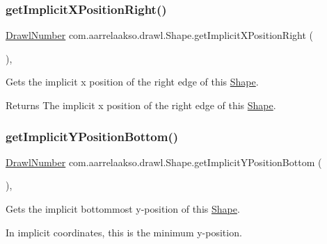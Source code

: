 \subsubsection{\texorpdfstring{get\+Implicit\+X\+Position\+Right()}{getImplicitXPositionRight()}}
{\footnotesize\ttfamily \hyperlink{classcom_1_1aarrelaakso_1_1drawl_1_1_drawl_number}{Drawl\+Number} com.\+aarrelaakso.\+drawl.\+Shape.\+get\+Implicit\+X\+Position\+Right (\begin{DoxyParamCaption}{ }\end{DoxyParamCaption})\hspace{0.3cm}{\ttfamily [protected]}, {\ttfamily [inherited]}}



Gets the implicit x position of the right edge of this \hyperlink{classcom_1_1aarrelaakso_1_1drawl_1_1_shape}{Shape}. 

\begin{DoxyReturn}{Returns}
The implicit x position of the right edge of this \hyperlink{classcom_1_1aarrelaakso_1_1drawl_1_1_shape}{Shape}. 
\end{DoxyReturn}
\mbox{\label{classcom_1_1aarrelaakso_1_1drawl_1_1_shape_af04961079cb3993d8f73670e6695415b}} 
\subsubsection{\texorpdfstring{get\+Implicit\+Y\+Position\+Bottom()}{getImplicitYPositionBottom()}}
{\footnotesize\ttfamily \hyperlink{classcom_1_1aarrelaakso_1_1drawl_1_1_drawl_number}{Drawl\+Number} com.\+aarrelaakso.\+drawl.\+Shape.\+get\+Implicit\+Y\+Position\+Bottom (\begin{DoxyParamCaption}{ }\end{DoxyParamCaption})\hspace{0.3cm}{\ttfamily [protected]}, {\ttfamily [inherited]}}



Gets the implicit bottommost y-\/position of this \hyperlink{classcom_1_1aarrelaakso_1_1drawl_1_1_shape}{Shape}. 

In implicit coordinates, this is the minimum y-\/position.

